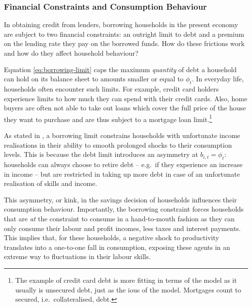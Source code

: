 \documentclass[12pt]{article} %
\numberwithin{equation}{section} %
\numberwithin{figure}{section}
\numberwithin{table}{section}
\begin{document}

\subsubsection{Financial Constraints and Consumption Behaviour}
\label{sec:model-hh-constraints}

In obtaining credit from lenders, borrowing households in the present economy are subject to two financial constraints: an outright limit to debt and a premium on the lending rate they pay on the borrowed funds. How do these frictions work and how do they affect household behaviour?

Equation \eqref{eq:borrowing-limit} caps the maximum \textit{quantity} of debt a household can hold on its balance sheet to amounts smaller or equal to $\phi_t$. In everyday life, households often encounter such limits. For example, credit card holders experience limits to how much they can spend with their credit cards. Also, home buyers are often not able to take out loans which cover the full price of the house they want to purchase and are thus subject to a mortgage loan limit.\footnote{The example of credit card debt is more fitting in terms of the model as it usually is unsecured debt, just as the \Gls{iou}s of the model. Mortgages count to secured, i.e.~collateralised, debt.}

As stated in \textcite{carroll2021}, a borrowing limit constrains households with unfortunate income realisations in their ability to smooth prolonged shocks to their consumption levels. This is because the debt limit introduces an asymmetry at $b_{i,t} = \phi_t$: households can always choose to retire debt -- e.g.~if they experience an increase in income -- but are restricted in taking up more debt in case of an unfortunate realisation of skills and income. 

This asymmetry, or kink, in the savings decision of households influences their consumption behaviour. Importantly, the borrowing constraint forces households that are \textit{at} the constraint to consume in a hand-to-mouth fashion as they can only consume their labour and profit incomes, less taxes and interest payments. This implies that, for these households, a negative shock to productivity translates into a one-to-one fall in consumption, exposing these agents in an extreme way to fluctuations in their labour skills. 
\end{document}
